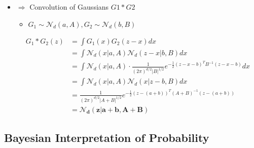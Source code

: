 \begin{itemize}
\begin{itemize}
	\item $\Rightarrow$ Convolution of Gaussians $G1* G2$
		\begin{itemize}
		\item $G_1\sim \mathcal N_d(a,A),G_2\sim \mathcal N_d(b,B)$
		\end{itemize}
		\begin{align*} \displaystyle G_1* G_2 (z) &= \int G_1(x)G_2(z-x)dx \\ &= \int \mathcal N_d (x|a,A)\mathcal N_d(z-x|b,B)dx \\ &= \int \mathcal N_d (x|a,A) \cdot \frac 1 {(2\pi)^{d/2} |B|^{1/2}} e^{-\frac 12 (z-x-b)^TB^{-1} (z-x-b)} dx \\ &= \int \mathcal N_d (x|a,A)\mathcal N_d(x|z-b,B)dx \\&= \frac 1 {(2\pi)^{d/2}|A+B|^{1/2}} e^{-\frac 12(z-(a+b))^T (A+B)^{-1} (z-(a+b))} \\&= \boldsymbol{\mathcal N_d(z|a+b,A+B)}  
		\end{align*}
	\end{itemize}
\end{itemize}
 
 
\subsection{Bayesian Interpretation of Probability}
